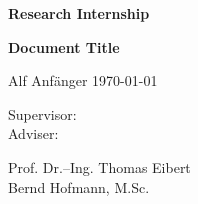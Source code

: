 
\begin{titlepage}

	\linespread{1}	
		\vspace*{-1cm}
		\hftheader
		
		\vspace{8cm}
		\Huge
		\textbf{Research Internship}
		\vspace{2cm}
		\LARGE
		\begin{flushleft}	
			\textbf{Document Title}
		\end{flushleft}
		\vspace{2cm}
		Alf Anfänger  \qquad \qquad \today \\[3cm] 
		\large	
	\parbox[b][3cm][t]{2.2cm}{
	        Supervisor: \\
	        Adviser: }
	\parbox[b][3cm][t]{6cm}{
	        Prof. Dr.--Ing. Thomas Eibert\\
	        Bernd Hofmann, M.Sc.
	        }				
\end{titlepage}	
